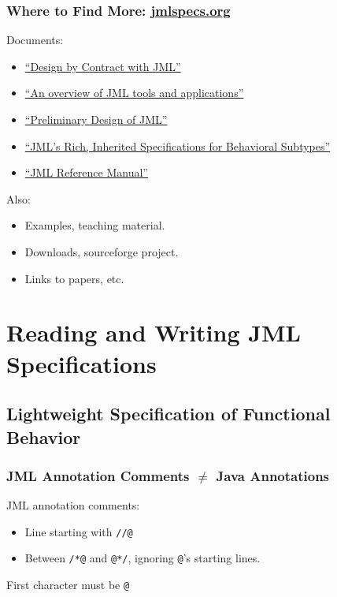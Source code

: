 \begin{frame}
\frametitle{Where to Find More: \href{https://www.jmlspecs.org}{jmlspecs.org}}

Documents:
\begin{itemize}
\item
\href{ftp://ftp.cs.iastate.edu/pub/leavens/JML/jmldbc.pdf}{``Design by Contract with JML''}

\item
\href{https://dx.doi.org/10.1007/s10009-004-0167-4}{``An overview of JML tools and applications''}

\item
\href{https://doi.acm.org/10.1145/1127878.1127884}{``Preliminary Design of JML''}

\item
\href{https://dx.doi.org/10.1007/11901433}{``JML's Rich, Inherited Specifications for Behavioral Subtypes''}

\item
\href{https://www.jmlspecs.org/jmlrefman/jmlrefman_toc.html}{``JML Reference Manual''}
\end{itemize}

Also:
\begin{itemize}
\item
Examples, teaching material.

\item
Downloads, sourceforge project.

\item
Links to papers, etc.
\end{itemize}

\end{frame}

\section[R/W]{Reading and Writing JML Specifications}

\subsection[Lightweight]{Lightweight Specification of Functional Behavior}

\begin{frame}[fragile]
\frametitle{JML Annotation Comments $\neq$ Java Annotations}

JML annotation comments:
\begin{itemize}
\item
Line starting with \lstinline!//@!

\item
Between \lstinline!/*@! and \lstinline!@*/!,
ignoring \lstinline!@!'s starting lines.
\end{itemize}

First character must be \lstinline!@!

\end{frame}

